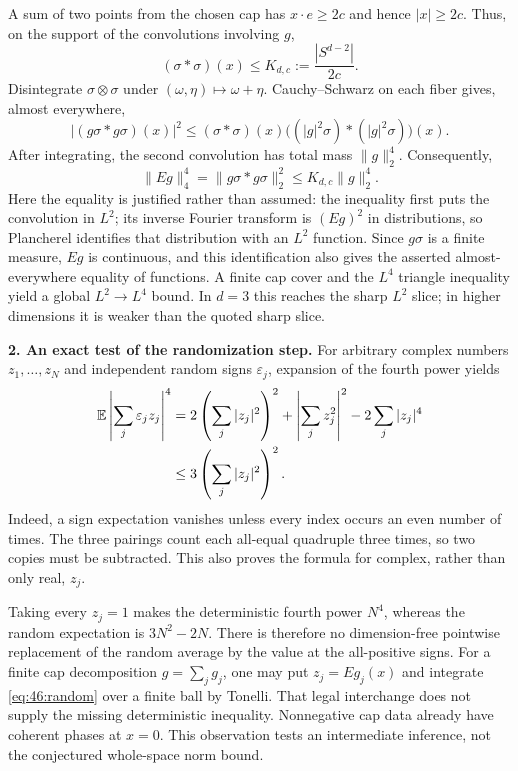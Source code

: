 \documentclass[11pt,a4paper]{article}
\numberwithin{equation}{section}
\begin{document}
A sum of two points from the chosen cap has $x\cdot e\ge2c$ and hence
$|x|\ge2c$. Thus, on the support of the convolutions involving $g$,
\[
 (\sigma*\sigma)(x)\le K_{d,c}:=\frac{|S^{d-2}|}{2c}.
\]
Disintegrate $\sigma\otimes\sigma$ under $(\omega,\eta)\mapsto\omega+\eta$.
Cauchy--Schwarz on each fiber gives, almost everywhere,
\[
 |(g\sigma*g\sigma)(x)|^2
 \le (\sigma*\sigma)(x)
       \bigl((|g|^2\sigma)*(|g|^2\sigma)\bigr)(x).
\]
After integrating, the second convolution has total mass $\|g\|_2^4$.
Consequently,
\begin{equation}\label{eq:46:cap-four}
 \|Eg\|_4^4=\|g\sigma*g\sigma\|_2^2
       \le K_{d,c}\|g\|_2^4.
\end{equation}
Here the equality is justified rather than assumed: the inequality first
puts the convolution in $L^2$; its inverse Fourier transform is $(Eg)^2$
in distributions, so Plancherel identifies that distribution with an $L^2$
function. Since $g\sigma$ is a finite measure, $Eg$ is continuous, and this
identification also gives the asserted almost-everywhere equality of
functions. A finite cap cover and the $L^4$ triangle inequality yield a
global $L^2\to L^4$ bound. In $d=3$ this reaches the sharp $L^2$ slice;
in higher dimensions it is weaker than the quoted sharp slice.

\textbf{2. An exact test of the randomization step.}
For arbitrary complex numbers $z_1,\ldots,z_N$ and independent random signs
$\varepsilon_j$, expansion of the fourth power yields
\begin{align}
 \mathbb E\left|\sum_j\varepsilon_jz_j\right|^4
 &=2\left(\sum_j|z_j|^2\right)^2+
       \left|\sum_jz_j^2\right|^2-2\sum_j|z_j|^4\notag\\
 &\le3\left(\sum_j|z_j|^2\right)^2.
 \label{eq:46:random}
\end{align}
Indeed, a sign expectation vanishes unless every index occurs an even
number of times. The three pairings count each all-equal quadruple three
times, so two copies must be subtracted. This also proves the formula for
complex, rather than only real, $z_j$.

Taking every $z_j=1$ makes the deterministic fourth power $N^4$, whereas
the random expectation is $3N^2-2N$. There is therefore no dimension-free
pointwise replacement of the random average by the value at the all-positive
signs. For a finite cap decomposition $g=\sum_jg_j$, one may put
$z_j=Eg_j(x)$ and integrate \eqref{eq:46:random} over a finite ball by
Tonelli. That legal interchange does not supply the missing deterministic
inequality. Nonnegative cap data already have coherent phases at $x=0$.
This observation tests an intermediate inference, not the conjectured
whole-space norm bound.
\end{document}
